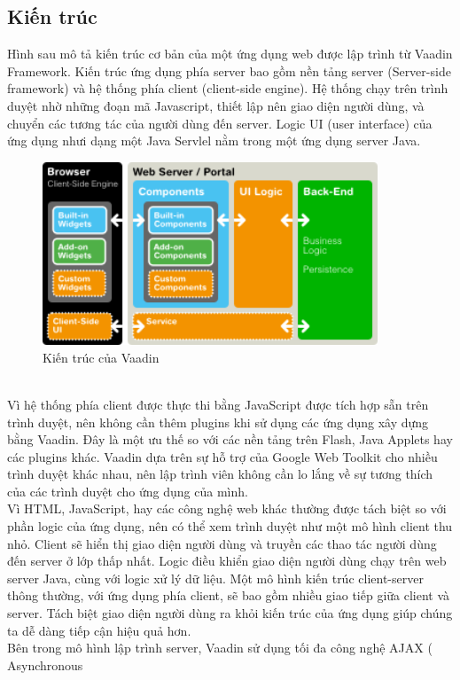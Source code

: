 \subsection{Kiến trúc}
Hình sau mô tả kiến trúc cơ bản của một ứng dụng web được lập trình từ Vaadin Framework. Kiến trúc ứng dụng phía server bao gồm nền tảng server (Server-side framework) và hệ thống phía client (client-side engine). Hệ thống chạy trên trình duyệt nhờ những đoạn mã Javascript, thiết lập nên giao diện người dùng, và chuyển các tương tác của người dùng đến server. Logic UI (user interface) của ứng dụng nhưi dạng một Java Servlel nằm trong một ứng dụng server Java.
\begin{figure}[ht!]
	\centering
	\includegraphics[width=100mm]{Figures/vaadin_architecture.png}
	\caption{Kiến trúc của Vaadin\label{overflow}}
\end{figure}
\\
Vì hệ thống phía client được thực thi bằng JavaScript được tích hợp sẵn trên trình duyệt, nên không cần thêm plugins khi sử dụng các ứng dụng xây dựng bằng Vaadin. Đây là một ưu thế so với các nền tảng trên Flash, Java Applets hay các plugins khác. Vaadin dựa trên sự hỗ trợ của Google Web Toolkit cho nhiều trình duyệt khác nhau, nên lập trình viên không cần lo lắng về sự tương thích của các trình duyệt cho ứng dụng của mình.
\\
Vì HTML, JavaScript, hay các công nghệ web khác thường được tách biệt so với phần logic 
của ứng dụng, nên có thể xem trình duyệt như một mô hình client thu nhỏ. Client sẽ hiển thị giao diện người dùng và truyền các thao tác người dùng đến server ở lớp thấp nhất. Logic điều khiển giao diện người dùng chạy trên web server Java, cùng với logic xử lý dữ liệu. Một mô hình kiến trúc client-server thông thường, với ứng dụng phía client, sẽ bao gồm nhiều giao tiếp giữa client và server. Tách biệt giao diện người dùng ra khỏi kiến trúc của ứng dụng giúp chúng ta dễ dàng tiếp cận hiệu quả hơn.
\\
Bên trong mô hình lập trình server, Vaadin sử dụng tối đa công nghệ AJAX ( Asynchronous
